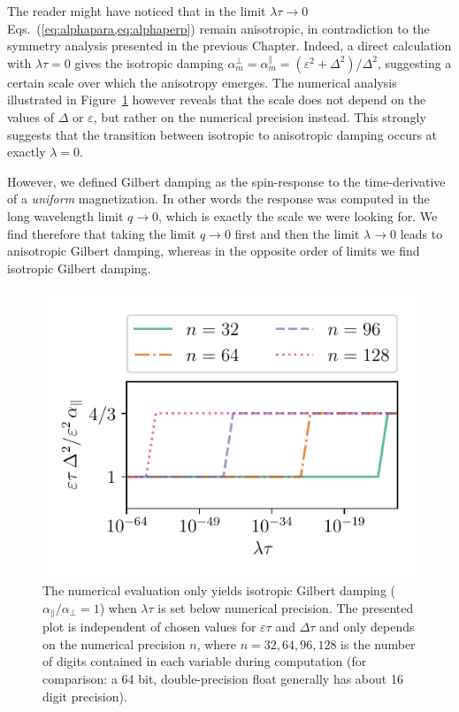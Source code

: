 The reader might have noticed that in the limit $\lambda\tau\rightarrow0$ Eqs.~(\ref{eq:alphapara,eq:alphaperp}) remain anisotropic, in contradiction to the symmetry analysis presented in the previous Chapter. Indeed, a direct calculation with $\lambda\tau=0$ gives the isotropic damping $\alpha_m^{\perp}=\alpha_m^{\parallel}=(\varepsilon^2+\Delta^2)/\Delta^2$, suggesting a certain scale over which the anisotropy emerges. The numerical analysis illustrated in Figure~\ref{fig:num_test} however reveals that the scale does not depend on the values of $\Delta$ or $\varepsilon$, but rather on the numerical precision instead. This strongly suggests that the transition between isotropic to anisotropic damping occurs at exactly $\lambda=0$. 

However, we defined Gilbert damping as the spin-response to the time-derivative of a \emph{uniform} magnetization. In other words the response was computed in the long wavelength limit $q\rightarrow0$, which is exactly the scale we were looking for. We find therefore that taking the limit $q\rightarrow0$ first and then the limit $\lambda\rightarrow0$ leads to anisotropic Gilbert damping, whereas in the opposite order of limits we find isotropic Gilbert damping.  

\begin{figure}
    \centering
    \includegraphics[width=0.75\linewidth]{gfx/numerical_test}
    \caption{The numerical evaluation only yields isotropic Gilbert damping ($\alpha_{\parallel}/\alpha_{\perp}=1$) when $\lambda\tau$ is set below numerical precision. The presented plot is independent of chosen values for $\varepsilon\tau$ and $\Delta\tau$ and only depends on the numerical precision $n$, where $n=32,64,96,128$ is the number of digits contained in each variable during computation (for comparison: a 64 bit, double-precision float generally has about 16 digit precision). }
    \label{fig:num_test}
\end{figure}

